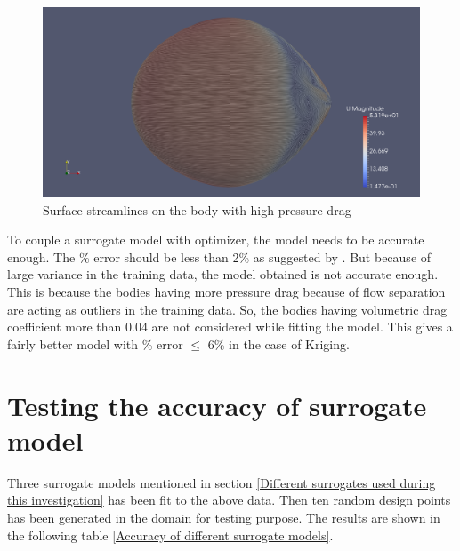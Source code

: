 \begin{figure}[H]
	\centering
	\includegraphics[width=300 pt]{rnd/streamlines_45.png}
	\caption{Surface streamlines on the body with high pressure drag}
	\label{high drag body} %
\end{figure}

To couple a surrogate model with optimizer, the model needs to be accurate enough. The \% error should be less than 2\% as suggested by \cite{alam2017thesis}. But because of large variance in the training data, the model obtained is not accurate enough. This is because the bodies having more pressure drag because of flow separation are acting as outliers in the training data. So, the bodies having volumetric drag coefficient more than 0.04 are not considered while fitting the model. This gives a fairly better model with \% error $ \le $ 6\% in the case of Kriging.

 


\section{Testing the accuracy of surrogate model}

Three surrogate models mentioned in section \ref{Different surrogates used during this investigation} has been fit to the above data. Then ten random design points has been generated in the domain for testing purpose. The results are shown in the following table \ref{Accuracy of different surrogate models}.

